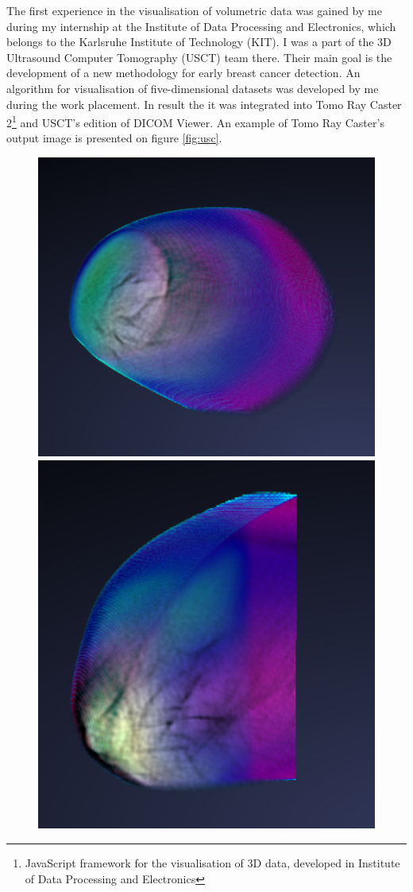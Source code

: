 \documentclass[twoside, english, 11pt]{report}
\begin{document}
The first experience in the visualisation of volumetric data was gained by me during my internship at the Institute of Data Processing and Electronics, which belongs to the Karlsruhe Institute of Technology (KIT). I was a part of the 3D Ultrasound Computer Tomography (USCT) team there. Their main goal is the development of a new methodology for early breast cancer detection. An algorithm for visualisation of five-dimensional datasets was developed by me during the work placement. In result the it was integrated into Tomo Ray Caster 2\footnote{JavaScript framework for the visualisation of 3D data, developed in Institute of Data Processing and Electronics} and USCT's edition of DICOM Viewer. An example of Tomo Ray Caster's output image is presented on figure \ref{fig:usc}.\\

\begin{figure}[!h]
\includegraphics[scale=0.4]{img/usct1}\includegraphics[scale=0.4335]{img/usct2}\\

\end{figure}
\end{document}
